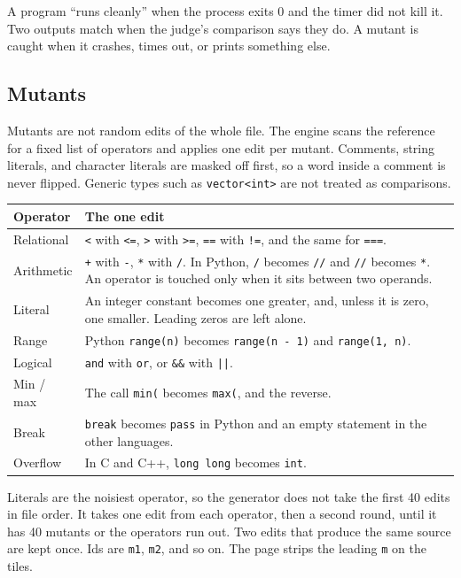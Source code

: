 \documentclass[10pt,a4paper]{article}
\begin{document}
A program ``runs cleanly'' when the process exits 0 and the timer did not kill it. Two outputs match when the judge's comparison says they do. A mutant is caught when it crashes, times out, or prints something else.

\subsection{Mutants}

Mutants are not random edits of the whole file. The engine scans the reference for a fixed list of operators and applies one edit per mutant. Comments, string literals, and character literals are masked off first, so a word inside a comment is never flipped. Generic types such as \texttt{vector<int>} are not treated as comparisons.

\needspace{6.4cm}
\begin{center}
\small
\begin{tabularx}{\textwidth}{@{}l Y@{}}
\toprule
\textbf{Operator} & \textbf{The one edit} \\
\midrule
Relational & \texttt{<} with \texttt{<=}, \texttt{>} with \texttt{>=}, \texttt{==} with \texttt{!=}, and the same for \texttt{===}. \\
Arithmetic & \texttt{+} with \texttt{-}, \texttt{*} with \texttt{/}. In Python, \texttt{/} becomes \texttt{//} and \texttt{//} becomes \texttt{*}. An operator is touched only when it sits between two operands. \\
Literal & An integer constant becomes one greater, and, unless it is zero, one smaller. Leading zeros are left alone. \\
Range & Python \texttt{range(n)} becomes \texttt{range(n - 1)} and \texttt{range(1, n)}. \\
Logical & \texttt{and} with \texttt{or}, or \texttt{\&\&} with \texttt{||}. \\
Min / max & The call \texttt{min(} becomes \texttt{max(}, and the reverse. \\
Break & \texttt{break} becomes \texttt{pass} in Python and an empty statement in the other languages. \\
Overflow & In C and C++, \texttt{long long} becomes \texttt{int}. \\
\bottomrule
\end{tabularx}
\end{center}

Literals are the noisiest operator, so the generator does not take the first 40 edits in file order. It takes one edit from each operator, then a second round, until it has 40 mutants or the operators run out. Two edits that produce the same source are kept once. Ids are \texttt{m1}, \texttt{m2}, and so on. The page strips the leading \texttt{m} on the tiles.
\end{document}
